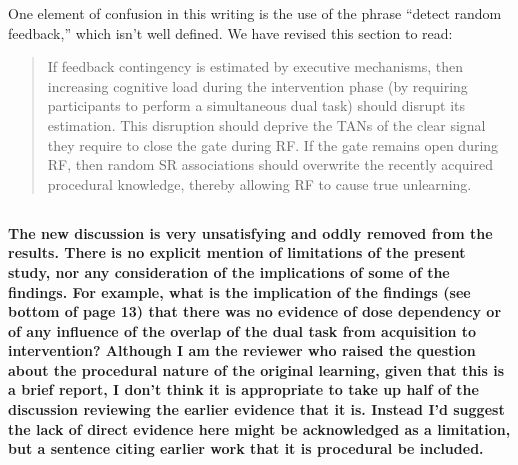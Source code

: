 \documentclass[10pt,a4paper]{article}
\begin{document}
One element of confusion in this writing is the use of the phrase ``detect
random feedback,'' which isn't well defined. We have revised this section to
read:

\begin{quote}
  If feedback contingency is estimated by executive mechanisms, then increasing
  cognitive load during the intervention phase (by requiring participants to
  perform a simultaneous dual task) should disrupt its estimation. This disruption
  should deprive the TANs of the clear signal they require to close the gate
  during RF. If the gate remains open during RF, then random SR associations
  should overwrite the recently acquired procedural knowledge, thereby allowing RF
  to cause true unlearning.
\end{quote}





\subsection{} \textbf{The new discussion is very unsatisfying and oddly removed
  from the results. There is no explicit mention of limitations of the present
  study, nor any consideration of the implications of some of the findings. For
  example, what is the implication of the findings (see bottom of page 13) that
  there was no evidence of dose dependency or of any influence of the overlap of
  the dual task from acquisition to intervention? Although I am the reviewer who
  raised the question about the procedural nature of the original learning, given
  that this is a brief report, I don't think it is appropriate to take up half of
  the discussion reviewing the earlier evidence that it is. Instead I'd suggest
  the lack of direct evidence here might be acknowledged as a limitation, but a
  sentence citing earlier work that it is procedural be included. }
\end{document}
